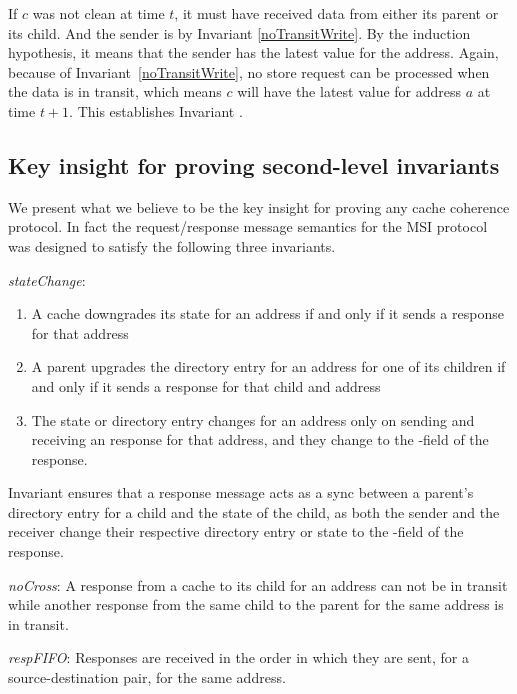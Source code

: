 If $c$ was not clean at time $t$, it must have received data from either its
parent or its child. And the sender is \clean{} by Invariant
\ref{noTransitWrite}. By the induction hypothesis, it means that the sender has
the latest value for the address. Again, because of
Invariant~\ref{noTransitWrite}, no store request can be processed when the data
is in transit, which means $c$ will have the latest value for address $a$ at
time $t+1$. This establishes Invariant .

\subsection{Key insight for proving second-level invariants}

We present what we believe to be the key insight for proving any cache coherence protocol.
In fact the request/response message semantics for the MSI protocol was designed to satisfy
the following three invariants.

\begin{inv}
\textit{stateChange}:
\begin{enumerate}
\item A cache downgrades its state for an address if and only if it sends a response for that address
\item A parent upgrades the directory entry for an address for one of
  its children if and only if it sends a response for that child and
  address
\item The state or directory entry changes for an address only on sending and
receiving an response for that address, and they change to the \myto-field of the response.
\end{enumerate}
\label{stateChange}
\end{inv}

Invariant  ensures that a response message acts as a sync
between a parent's directory entry for a child and the state of the child, as
both the sender and the receiver change their respective directory entry or
state to the \myto-field of the response.

\begin{inv}
\textit{noCross}: A response from a cache to its child for an address can not
be in transit while another response from the same child to the parent for the
same address is in transit.
\label{noCross}
\end{inv}

\begin{inv}
\textit{respFIFO}: Responses are received in the order in which they are sent,
for a source-destination pair, for the same address.
\label{respFIFO}
\end{inv}

